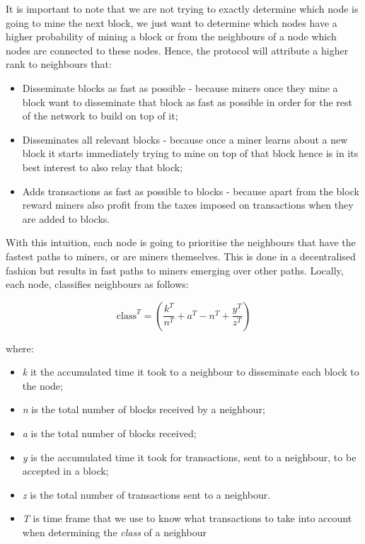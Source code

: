 It is important to note that we are not trying to exactly determine which node is going to mine the next block, we just want to determine which nodes have a higher probability of mining a block or from the neighbours of a node which nodes are connected to these nodes. 
Hence, the protocol will attribute a higher rank to neighbours that:
\begin{itemize}
    \item Disseminate blocks as fast as possible - because miners once they mine a block want to disseminate that block as fast as possible in order for the rest of the network to build on top of it;
    \item Disseminates all relevant blocks - because once a miner learns about a new block it starts immediately trying to mine on top of that block hence is in its best interest to also relay that block;
    \item Adds transactions as fast as possible to blocks - because apart from the block reward miners also profit from the taxes imposed on transactions when they are added to blocks.
\end{itemize}

With this intuition, each node is going to prioritise the neighbours that have the fastest paths to miners, or are miners themselves.
This is done in a decentralised fashion but results in fast paths to miners emerging over other paths.
Locally, each node, classifies neighbours as follows:

\begin{equation} \mbox{class}^{T}= (\dfrac{k^{T}}{n^{T}} + a^{T} - n^{T} + \dfrac{y^{T}}{z^{T}}) \end{equation}

where:
\begin{itemize}
  \item \textit{k} it the accumulated time it took to a neighbour to disseminate each block to the node;
  \item \textit{n} is the total number of blocks received by a neighbour;
  \item \textit{a} is the total number of blocks received;
  \item \textit{y} is the accumulated time it took for transactions, sent to a neighbour, to be accepted in a block;
  \item \textit{z} is the total number of transactions sent to a neighbour.
  \item \textsl{T} is time frame that we use to know what transactions to take into account when determining the \textsl{class} of a neighbour
\end{itemize}

